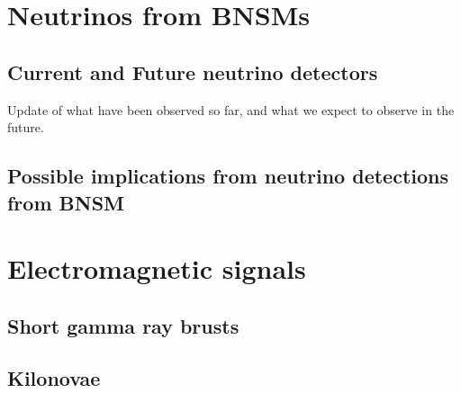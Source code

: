 \section[Neutrinos from BNSMs]{Neutrinos from BNSMs}
\subsection[Current and Future neutrino detectors]{Current and Future neutrino detectors}
Update of what have been observed so far, and what we expect to observe in the future.
\subsection[Possible implications from neutrinos from BNSM]{Possible implications from neutrino detections from BNSM}
\section[Electromagnetic Signals]{Electromagnetic signals}
\subsection[Short Gamma Ray Brusts]{Short gamma ray brusts}
\subsection[Kilonova]{Kilonovae}



%

